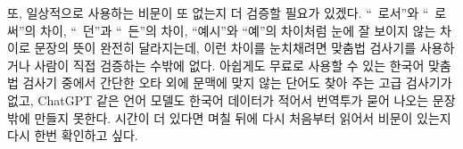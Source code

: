 \documentclass{translation}
\begin{document}
또, 일상적으로 사용하는 비문이 또 없는지 더 검증할 필요가 있겠다.
``~로서''와 ``~로써''의 차이, ``~던''과 ``~든''의 차이, ``예시''와 ``예''의 차이처럼 눈에 잘 보이지 않는 차이로 문장의 뜻이 완전히 달라지는데, 이런 차이를 눈치채려면 맞춤법 검사기를 사용하거나 사람이 직접 검증하는 수밖에 없다.
아쉽게도 무료로 사용할 수 있는 한국어 맞춤법 검사기 중에서 간단한 오타 외에 문맥에 맞지 않는 단어도 찾아 주는 고급 검사기가 없고, ChatGPT 같은 언어 모델도 한국어 데이터가 적어서 번역투가 묻어 나오는 문장밖에 만들지 못한다.
시간이 더 있다면 며칠 뒤에 다시 처음부터 읽어서 비문이 있는지 다시 한번 확인하고 싶다.
\end{document}
